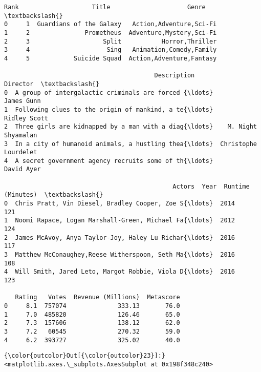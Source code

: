 \documentclass[11pt]{article}
\begin{document}
    \begin{Verbatim}[commandchars=\\\{\}]
   Rank                    Title                     Genre  \textbackslash{}
0     1  Guardians of the Galaxy   Action,Adventure,Sci-Fi   
1     2               Prometheus  Adventure,Mystery,Sci-Fi   
2     3                    Split           Horror,Thriller   
3     4                     Sing   Animation,Comedy,Family   
4     5            Suicide Squad  Action,Adventure,Fantasy   

                                         Description              Director  \textbackslash{}
0  A group of intergalactic criminals are forced {\ldots}            James Gunn   
1  Following clues to the origin of mankind, a te{\ldots}          Ridley Scott   
2  Three girls are kidnapped by a man with a diag{\ldots}    M. Night Shyamalan   
3  In a city of humanoid animals, a hustling thea{\ldots}  Christophe Lourdelet   
4  A secret government agency recruits some of th{\ldots}            David Ayer   

                                              Actors  Year  Runtime (Minutes)  \textbackslash{}
0  Chris Pratt, Vin Diesel, Bradley Cooper, Zoe S{\ldots}  2014                121   
1  Noomi Rapace, Logan Marshall-Green, Michael Fa{\ldots}  2012                124   
2  James McAvoy, Anya Taylor-Joy, Haley Lu Richar{\ldots}  2016                117   
3  Matthew McConaughey,Reese Witherspoon, Seth Ma{\ldots}  2016                108   
4  Will Smith, Jared Leto, Margot Robbie, Viola D{\ldots}  2016                123   

   Rating   Votes  Revenue (Millions)  Metascore  
0     8.1  757074              333.13       76.0  
1     7.0  485820              126.46       65.0  
2     7.3  157606              138.12       62.0  
3     7.2   60545              270.32       59.0  
4     6.2  393727              325.02       40.0  

    \end{Verbatim}

\begin{Verbatim}[commandchars=\\\{\}]
{\color{outcolor}Out[{\color{outcolor}23}]:} <matplotlib.axes.\_subplots.AxesSubplot at 0x198f348c240>
\end{Verbatim}
            
    \begin{center}
    \end{center}
    { \hspace*{\fill} \\}
    
\end{document}
